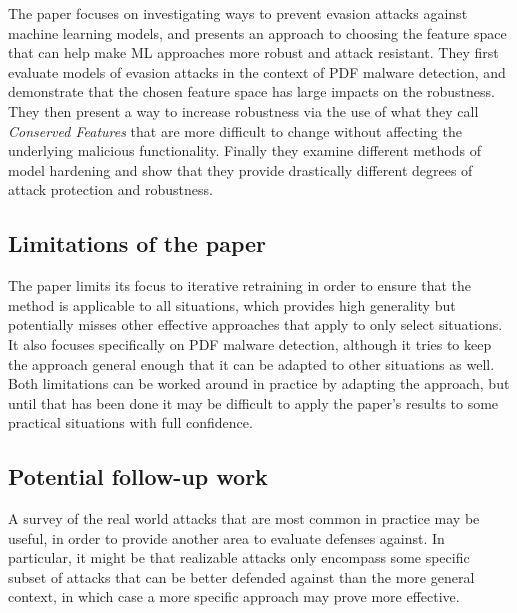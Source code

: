 \documentclass[11pt]{article}
\begin{document}
The paper focuses on investigating ways to prevent evasion attacks against machine learning models, and presents an approach to choosing the feature space that can help make ML approaches more robust and attack resistant.
They first evaluate models of evasion attacks in the context of PDF malware detection, and demonstrate that the chosen feature space has large impacts on the robustness.
They then present a way to increase robustness via the use of what they call \textit{Conserved Features} that are more difficult to change without affecting the underlying malicious functionality.
Finally they examine different methods of model hardening and show that they provide drastically different degrees of attack protection and robustness.

\subsection*{Limitations of the paper}

The paper limits its focus to iterative retraining in order to ensure that the method is applicable to all situations, which provides high generality but potentially misses other effective approaches that apply to only select situations.
It also focuses specifically on PDF malware detection, although it tries to keep the approach general enough that it can be adapted to other situations as well.
Both limitations can be worked around in practice by adapting the approach, but until that has been done it may be difficult to apply the paper's results to some practical situations with full confidence.

\subsection*{Potential follow-up work}

A survey of the real world attacks that are most common in practice may be useful, in order to provide another area to evaluate defenses against.
In particular, it might be that realizable attacks only encompass some specific subset of attacks that can be better defended against than the more general context, in which case a more specific approach may prove more effective.
\end{document}

